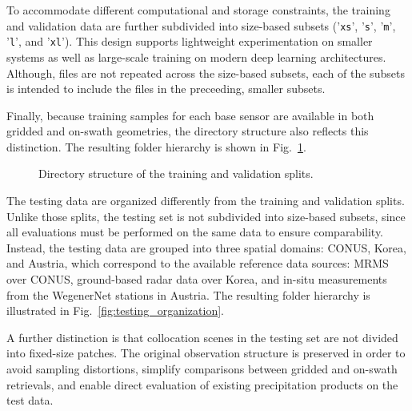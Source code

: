 \documentclass[11pt]{article}
\begin{document}
To accommodate different computational and storage constraints, the training and
validation data are further subdivided into size-based subsets ('\texttt{xs}',
'\texttt{s}', '\texttt{m}', '\texttt{l}', and '\texttt{xl}'). This design
supports lightweight experimentation on smaller systems as well as large-scale
training on modern deep learning architectures. Although, files are not repeated across the size-based subsets, each of the subsets is intended to include the files in the preceeding, smaller subsets.

Finally, because training samples for each base sensor are available in both
gridded and on-swath geometries, the directory structure also reflects this
distinction. The resulting folder hierarchy is shown in
Fig.~\ref{fig:train_val_organization}.

\begin{figure}[htbp] %


	\caption{
		Directory structure of the training and validation splits.
	}
	\label{fig:train_val_organization}
\end{figure}

The testing data are organized differently from the training and validation splits. Unlike those splits, the testing set is not subdivided into size-based subsets, since all evaluations must be performed on the same data to ensure comparability. Instead, the testing data are grouped into three spatial domains: CONUS, Korea, and Austria, which correspond to the available reference data sources: MRMS over CONUS, ground-based radar data over Korea, and in-situ measurements from the WegenerNet stations in Austria. The resulting folder hierarchy is illustrated in Fig.~\ref{fig:testing_organization}.

A further distinction is that collocation scenes in the testing set are not
divided into fixed-size patches. The original observation structure is preserved
in order to avoid sampling distortions, simplify comparisons between gridded and
on-swath retrievals, and enable direct evaluation of existing precipitation
products on the test data.
\end{document}
